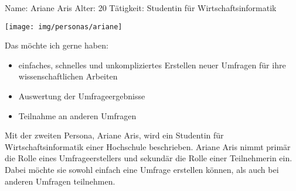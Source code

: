 
%
\newpage
{}
\begin{minipage}[t]{0.5\textwidth} 	\vspace{0.2\baselineskip} %
	\begin{entrylist}
		\entry
		{Name:}
		{Ariane Aris}
			\entry
		{Alter:}
		{20}
		\entry
		{Tätigkeit:}
		{Studentin für Wirtschaftsinformatik}
	\end{entrylist}
	\begin{barchart}{5.0}\hspace{-1mm}
	\end{barchart}
\end{minipage}
\hfil
\begin{minipage}[t]{0.4\textwidth} 	\vspace{0.0\baselineskip} %
	\flushright
	\texttt{[image: img/personas/ariane]}
\end{minipage}
\autocite{rf-unsplash-studentin}

Das möchte ich gerne haben:
\begin{itemize}
	\item einfaches, schnelles und unkompliziertes Erstellen neuer Umfragen für ihre wissenschaftlichen Arbeiten
	\item Auswertung der Umfrageergebnisse
    \item Teilnahme an anderen Umfragen
\end{itemize}

Mit der zweiten Persona, Ariane Aris, wird ein Studentin für Wirtschaftsinformatik einer Hochschule beschrieben.
Ariane Aris nimmt primär die Rolle eines Umfrageerstellers und sekundär die Rolle einer Teilnehmerin ein.
Dabei möchte sie sowohl einfach eine Umfrage erstellen können, als auch bei anderen Umfragen teilnehmen.